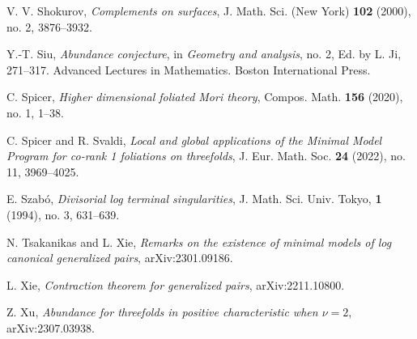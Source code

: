 \documentclass[11pt]{amsart}
\numberwithin{equation}{section}
\theoremstyle{definition}
\theoremstyle{definition}
\theoremstyle{definition}
\begin{document}
\begin{thebibliography}{99}
   V. V. Shokurov, \textit{Complements on surfaces}, J. Math. Sci. (New York) \textbf{102} (2000), no. 2, 3876--3932.

   Y.-T. Siu, \textit{Abundance conjecture}, in \textit{ Geometry and analysis}, no. 2, Ed. by L. Ji, 271--317. Advanced Lectures in Mathematics. Boston International Press.

   C. Spicer, \textit{Higher dimensional foliated Mori theory}, Compos. Math. \textbf{156} (2020), no. 1, 1--38.

   C. Spicer and R. Svaldi, \textit{Local and global applications of the Minimal Model Program for co-rank 1 foliations on threefolds}, J. Eur. Math. Soc. \textbf{24} (2022), no. 11, 3969--4025.

   E. Szab\'o, \textit{Divisorial log terminal singularities}, J. Math. Sci. Univ. Tokyo, \textbf{1} (1994), no. 3, 631--639.

   N. Tsakanikas and L. Xie, \textit{Remarks on the existence of minimal models of log canonical generalized pairs}, arXiv:2301.09186.

   L. Xie, \textit{Contraction theorem for generalized pairs}, arXiv:2211.10800.

   Z. Xu, \textit{Abundance for threefolds in positive characteristic when $\nu=2$}, arXiv:2307.03938.

\end{thebibliography}
\end{document}
